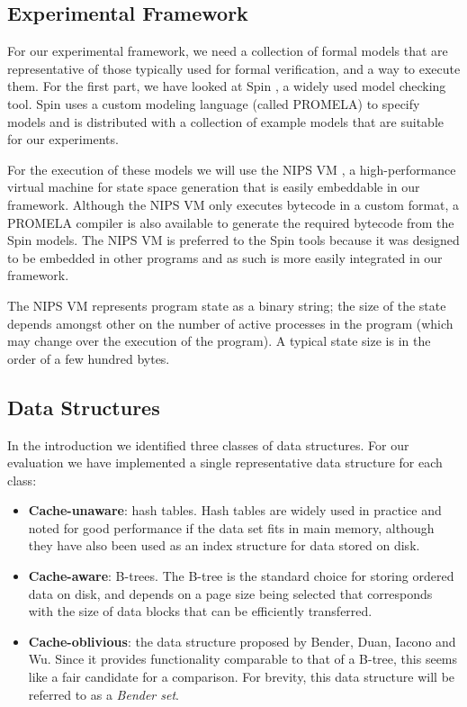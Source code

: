 \documentclass{acm_proc_article-sp}
\begin{document}
\subsection{Experimental Framework}
For our experimental framework, we need a collection of formal models that are
representative of those typically used for formal verification, and a way to
execute them. For the first part, we have looked at Spin \cite{spin}, a widely
used model checking tool. Spin uses a custom modeling language (called
PROMELA) to specify models and is distributed with a collection of example
models that are suitable for our experiments.

For the execution of these models we will use the NIPS VM \cite{weber2007evm}, a
high-performance virtual machine for state space generation that is easily
embeddable in our framework. Although the NIPS VM only executes bytecode in a
custom format, a PROMELA compiler is also available to generate the required
bytecode from the Spin models.\cite{nipsvm} The NIPS VM is preferred to the
Spin tools because it was designed to be embedded in other programs and as
such is more easily integrated in our framework.

The NIPS VM represents program state as a binary string; the size of the state
depends amongst other on the number of active processes in the program (which may change over the execution of the program). A typical state size is in the order of a few hundred bytes.

\subsection{Data Structures}
In the introduction we identified three classes of data structures.
For our evaluation we have implemented a single representative data structure
for each class:
\begin{itemize}
\item \textbf{Cache-unaware}: hash tables. Hash tables are widely used in practice and noted for good performance if the data set fits in main memory, although they have also been used as an index structure for data stored on disk.
\item \textbf{Cache-aware}: B-trees. The B-tree is the standard choice for storing ordered data on disk, and depends on a page size being selected that corresponds with the size of data blocks that can be efficiently transferred.
\item \textbf{Cache-oblivious}: the data structure proposed by Bender, Duan, Iacono and Wu. Since it provides functionality comparable to that of a B-tree, this seems like a fair candidate for a comparison. For brevity, this data structure will be referred to as a \emph{Bender set}.
\end{itemize}
\end{document}
